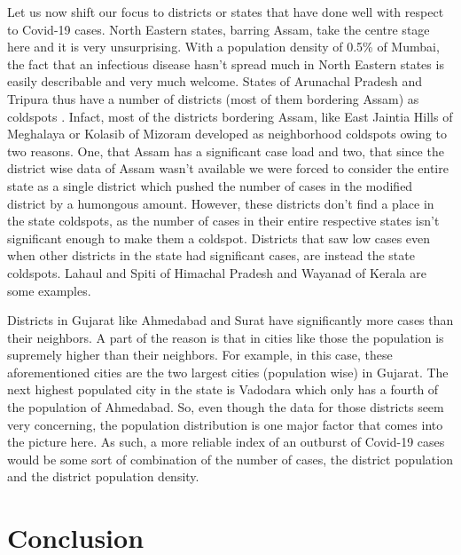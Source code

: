 \documentclass[letterpaper,12pt]{article}
\begin{document}
Let us now shift our focus to districts or states that have done well with respect to Covid-19 cases. North Eastern states, barring Assam, take the centre stage here and it is very unsurprising. With a population density of 0.5\% of Mumbai, the fact that an infectious disease hasn't spread much in North Eastern states is easily describable and very much welcome. States of Arunachal Pradesh and Tripura thus have a number of districts (most of them bordering Assam) as coldspots . Infact, most of the districts bordering Assam, like East Jaintia Hills of Meghalaya or Kolasib of Mizoram developed as neighborhood coldspots owing to two reasons. One, that Assam has a significant case load and two, that since the district wise data of Assam wasn't available we were forced to consider the entire state as a single district which pushed the number of cases in the modified district by a humongous amount. However, these districts don't find a place in the state coldspots, as the number of cases in their entire respective states isn't significant enough to make them a coldspot. Districts that saw low cases even when other districts in the state had significant cases, are instead the state coldspots. Lahaul and Spiti of Himachal Pradesh and Wayanad of Kerala are some examples. 

Districts in Gujarat like Ahmedabad and Surat have significantly more cases than their neighbors. A part of the reason is that in cities like those the population is supremely higher than their neighbors. For example, in this case, these aforementioned cities are the two largest cities (population wise) in Gujarat. The next highest populated city in the state is Vadodara which only has a fourth of the population of Ahmedabad. So, even though the data for those districts seem very concerning, the population distribution is one major factor that comes into the picture here. As such, a more reliable index of an outburst of Covid-19 cases would be some sort of combination of the number of cases, the district population and the district population density. 

\section{Conclusion}
\end{document}
